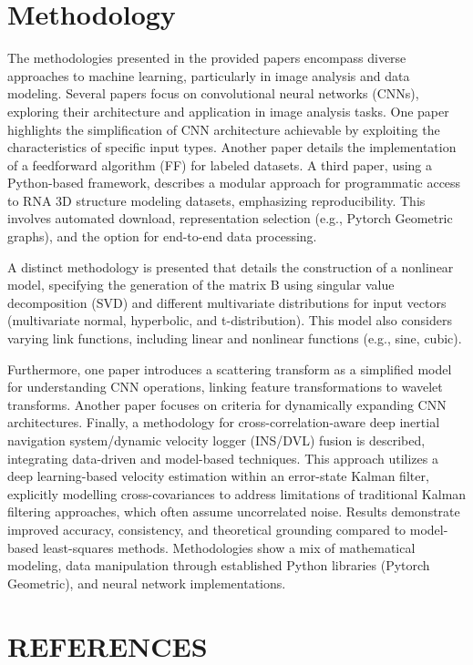 \documentclass{article}
\begin{document}
\section*{Methodology}
The methodologies presented in the provided papers encompass diverse approaches to machine learning, particularly in image analysis and data modeling.  Several papers focus on convolutional neural networks (CNNs), exploring their architecture and application in image analysis tasks.  One paper highlights the simplification of CNN architecture achievable by exploiting the characteristics of specific input types. Another paper details the implementation of a feedforward algorithm (FF) for labeled datasets.  A third paper, using a Python-based framework, describes a modular approach for programmatic access to RNA 3D structure modeling datasets, emphasizing reproducibility.  This involves automated download, representation selection (e.g., Pytorch Geometric graphs), and the option for end-to-end data processing.

A distinct methodology is presented that details the construction of a nonlinear model, specifying the generation of the matrix B using singular value decomposition (SVD) and different multivariate distributions for input vectors (multivariate normal, hyperbolic, and t-distribution). This model also considers varying link functions, including linear and nonlinear functions (e.g., sine, cubic).

Furthermore, one paper introduces a scattering transform as a simplified model for understanding CNN operations, linking feature transformations to wavelet transforms.  Another paper focuses on criteria for dynamically expanding CNN architectures.  Finally, a methodology for cross-correlation-aware deep inertial navigation system/dynamic velocity logger (INS/DVL) fusion is described, integrating data-driven and model-based techniques. This approach utilizes a deep learning-based velocity estimation within an error-state Kalman filter, explicitly modelling cross-covariances to address limitations of traditional Kalman filtering approaches, which often assume uncorrelated noise.  Results demonstrate improved accuracy, consistency, and theoretical grounding compared to model-based least-squares methods.  Methodologies show a mix of mathematical modeling, data manipulation through established Python libraries (Pytorch Geometric), and neural network implementations.


\section*{REFERENCES}
\end{document}
